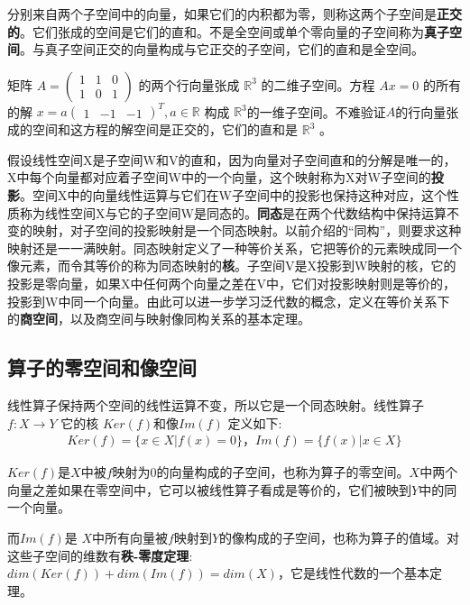 	分别来自两个子空间中的向量，如果它们的内积都为零，则称这两个子空间是\textbf{正交的}。它们张成的空间是它们的直和。不是全空间或单个零向量的子空间称为\textbf{真子空间}。与真子空间正交的向量构成与它正交的子空间，它们的直和是全空间。
	
	\kaishu
	
	矩阵   $ A=\begin{pmatrix} 1&1&0 \\1&0 &1\end{pmatrix} $  的两个行向量张成  $ \mathbb{R}^3 $ 的二维子空间。方程 $ Ax=0 $ 的所有的解 $ x= a\begin{pmatrix}1&-1&-1 \end{pmatrix}^T,a\in \mathbb{R} $  构成 $ \mathbb{R}^3 $的一维子空间。不难验证$ A $的行向量张成的空间和这方程的解空间是正交的，它们的直和是  $ \mathbb{R}^3 $ 。
	
	\songti
	
	假设线性空间X是子空间W和V的直和，因为向量对子空间直和的分解是唯一的， X中每个向量都对应着子空间W中的一个向量，这个映射称为X对W子空间的\textbf{投影}。空间X中的向量线性运算与它们在W子空间中的投影也保持这种对应，这个性质称为线性空间X与它的子空间W是同态的。\textbf{同态}是在两个代数结构中保持运算不变的映射，对子空间的投影映射是一个同态映射。以前介绍的“同构”，则要求这种映射还是一一满映射。同态映射定义了一种等价关系，它把等价的元素映成同一个像元素，而令其等价的称为同态映射的\textbf{核}。子空间V是X投影到W映射的核，它的投影是零向量，如果X中任何两个向量之差在V中，它们对投影映射则是等价的，投影到W中同一个向量。由此可以进一步学习泛代数的概念，定义在等价关系下的\textbf{商空间}，以及商空间与映射像同构关系的基本定理。
	
	\subsection{算子的零空间和像空间}
	
	线性算子保持两个空间的线性运算不变，所以它是一个同态映射。线性算子$  f:X \to Y $ 它的核 $ Ker(f)  $和像$  Im(f) $  定义如下:
	\begin{gather*}
		Ker(f) = \{ x\in X | f(x)= 0 \} ，Im (f) = \{f (x)| x \in X\}  
	\end{gather*}

	$ Ker(f)  $是$  X  $中被$ f $映射为0的向量构成的子空间，也称为算子的零空间。$ X $中两个向量之差如果在零空间中，它可以被线性算子看成是等价的，它们被映到$ Y $中的同一个向量。
	
	而$ Im(f)  $是 $ X $中所有向量被$ f $映射到$ Y $的像构成的子空间，也称为算子的值域。对这些子空间的维数有\textbf{秩-零度定理}:  $ dim(Ker(f))+dim (Im(f))=dim(X) $，它是线性代数的一个基本定理。
	
